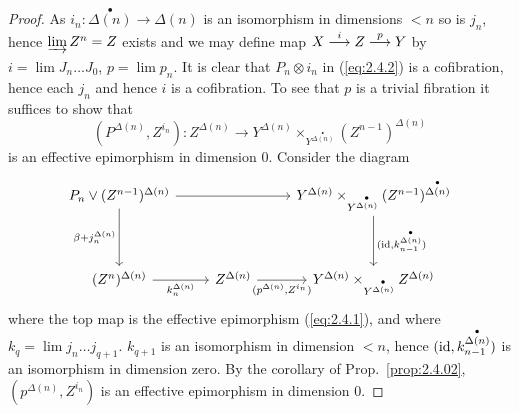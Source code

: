 \documentclass[../main]{subfiles}
\begin{document}
\begin{proof}
As $i_n \colon \overset{\bullet}{\Delta(n)} \longrightarrow \Delta(n)$ is an isomorphism in dimensions $<n$ so is $j_n$, hence $\varinjlim Z^n = Z$ exists and we may define map $X \varrightarrow i Z \varrightarrow p Y$ by $i = \lim J_n \dots J_0$, $p = \lim p_n$. It is clear that $P_n \otimes i_n$ in (\ref{eq:2.4.2}) is a cofibration, hence each $j_n$ and hence $i$ is a cofibration. To see that $p$ is a trivial fibration it suffices to show that 
\[(P^{\Delta(n)}, Z^{i_n}) \colon Z^{\Delta(n)} \longrightarrow Y^{\Delta(n)} \times_{Y^{\overset{\bullet}{\Delta(n)}}} (Z^{n-1})^{\Delta(n)}\] is an effective epimorphism in dimension $0$. Consider the diagram
\[
\begin{tikzcd}
    P_n \vee (Z^{n-1})^{\Delta(n)}
    \arrow[rr]
    \arrow[dd, "\beta + j_n^{\Delta(n)}"']
    &&
    Y^{\Delta(n)} \times_{Y^{\overset{\bullet}{\Delta(n)}}} (Z^{n-1})^{\overset{\bullet}{\Delta(n)}}
    \arrow[dd, "{(\id, k_{n-1}^{\overset{\bullet}{\Delta(n)}}})"]
    \\ \\
    (Z^n)^{\Delta(n)}
    \arrow[r, "k_n^{\Delta(n)}"']
    &
    Z^{\Delta(n)}
    \arrow[r, "{(p^{\Delta(n)}, Z^{i_n})}"']
    &
    Y^{\Delta(n)} \times_{Y^{\overset{\bullet}{\Delta(n)}}} Z^{\Delta(n)}
\end{tikzcd}
\]
where the top map is the effective epimorphism (\ref{eq:2.4.1}), and where $k_q = \lim j_n \dots j_{q+1}$. $k_{q+1}$ is an isomorphism in dimension $<n$, hence $(\operatorname{id}, k_{n-1}^{\overset{\bullet}{\Delta(n)}})$ is an isomorphism in dimension zero. By the corollary of Prop.\ \ref{prop:2.4.02}, $(p^{\Delta(n)}, Z^{i_n})$ is an effective epimorphism in dimension $0$.
\end{proof}
\end{document}
